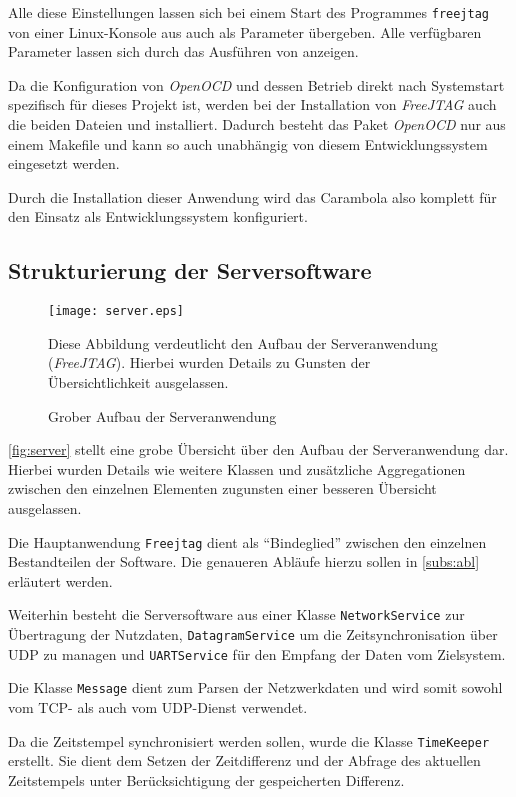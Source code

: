 Alle diese Einstellungen lassen sich bei einem Start des Programmes
\texttt{freejtag} von einer Linux-Konsole aus auch als Parameter
übergeben. Alle verfügbaren Parameter lassen sich durch das Ausführen von
 anzeigen.

Da die Konfiguration von \emph{OpenOCD} und dessen Betrieb direkt nach
Systemstart spezifisch für dieses Projekt ist, werden bei der Installation von
\emph{FreeJTAG} auch die beiden Dateien  und
 installiert. Dadurch besteht das Paket
\emph{OpenOCD} nur aus einem Makefile und kann so auch unabhängig von diesem
Entwicklungssystem eingesetzt werden.

Durch die Installation dieser Anwendung wird das Carambola also komplett für den
Einsatz als Entwicklungssystem konfiguriert.

\subsection{Strukturierung der Serversoftware}
\begin{figure}[!ht]
\centering
\texttt{[image: server.eps]}
\caption{Grober Aufbau der Serveranwendung}{Diese Abbildung verdeutlicht den
Aufbau der Serveranwendung (\emph{FreeJTAG}). Hierbei wurden Details zu Gunsten der
Übersichtlichkeit ausgelassen.}
\label{fig:server}
\end{figure}
\autoref{fig:server} stellt eine grobe Übersicht über den Aufbau der
Serveranwendung dar. Hierbei wurden Details wie weitere Klassen und
zusätzliche Aggregationen zwischen den einzelnen Elementen zugunsten einer
besseren Übersicht ausgelassen.

Die Hauptanwendung \texttt{Freejtag} dient als "`Bindeglied"' zwischen den
einzelnen Bestandteilen der Software. Die genaueren Abläufe hierzu sollen in
\autoref{subs:abl} erläutert werden.

Weiterhin besteht die Serversoftware aus einer Klasse
\texttt{NetworkService} zur Übertragung der Nutzdaten, \texttt{DatagramService}
um die Zeitsynchronisation über UDP zu managen und \texttt{UARTService} für den
Empfang der Daten vom Zielsystem.

Die Klasse \texttt{Message} dient zum Parsen der Netzwerkdaten und wird somit
sowohl vom TCP- als auch vom UDP-Dienst verwendet.

Da die Zeitstempel synchronisiert werden sollen, wurde die Klasse
\texttt{TimeKeeper} erstellt. Sie dient dem Setzen der Zeitdifferenz und der
Abfrage des aktuellen Zeitstempels unter Berücksichtigung der gespeicherten
Differenz.

